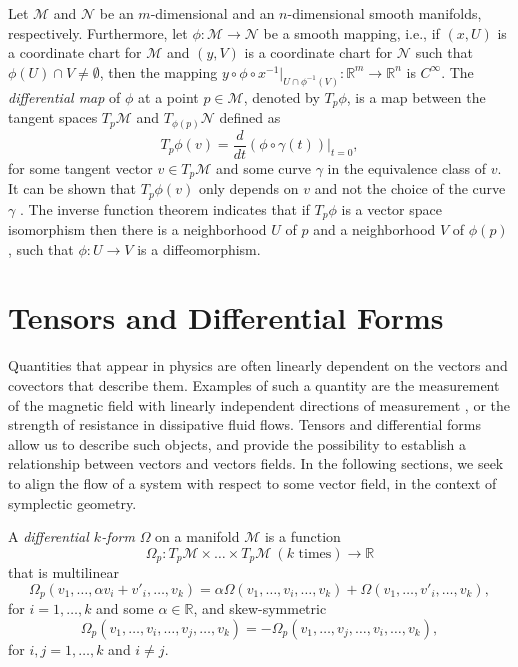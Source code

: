Let $\mathcal M$ and $\mathcal N$ be an $m$-dimensional and an $n$-dimensional smooth manifolds, respectively. Furthermore, let $\phi:\mathcal M\to \mathcal N$ be a smooth mapping, i.e., if $(x,U)$ is a coordinate chart for $\mathcal M$ and $(y,V)$ is a coordinate chart for $\mathcal N$ such that $\phi(U)\cap V\neq \emptyset$, then the mapping $y\circ \phi \circ x^{-1}|_{U\cap \phi^{-1}(V)}:\mathbb R^{m}\to \mathbb R^{n}$ is $C^{\infty}$. The \emph{differential map} of $\phi$ at a point $p\in \mathcal M$, denoted by $T_{p}\phi$, is a map between the tangent spaces $T_p \mathcal M$ and $T_{\phi(p)} \mathcal N$ defined as
\begin{equation} \label{eq:2.4}
	T_p \phi(v) = \frac{d}{dt}(\phi\circ \gamma(t))|_{t=0},
\end{equation}
for some tangent vector $v\in T_{p} \mathcal M$ and some curve $\gamma$ in the equivalence class of $v$. It can be shown that $T_p \phi(v)$ only depends on $v$ and not the choice of the curve $\gamma$ \cite{robbin2011introduction}. The inverse function theorem \cite{rudin1976principles} indicates that if $T_p\phi$ is a vector space isomorphism then there is a neighborhood $U$ of $p$ and a neighborhood $V$ of $\phi(p)$, such that $\phi:U\to V$ is a diffeomorphism.

\section{Tensors and Differential Forms} \label{section:2.2}
Quantities that appear in physics are often linearly dependent on the vectors and covectors that describe them. Examples of such a quantity are the measurement of the magnetic field with linearly independent directions of measurement \cite{Wald:106274}, or the strength of resistance in dissipative fluid flows. Tensors and differential forms allow us to describe such objects, and provide the possibility to establish a relationship between vectors and vectors fields. In the following sections, we seek to align the flow of a system with respect to some vector field, in the context of symplectic geometry. 

\begin{definition}
A \emph{differential $k$-form} $\Omega$ on a manifold $\mathcal M$ is a function 
\[
		\Omega_p: T_p\mathcal M \times \dots \times T_p\mathcal M \ (k \text{ times}) \to \mathbb R
\]
that is multilinear
\[
	\Omega_p(v_1,\dots,\alpha v_i + v'_i, \dots, v_k) = \alpha \Omega(v_1,\dots,v_i, \dots, v_k) + \Omega(v_1,\dots,v'_i, \dots, v_k),
\]
for $i=1,\dots,k$ and some $\alpha \in \mathbb R$, and skew-symmetric
\[
	\Omega_p(v_1,\dots,v_i,\dots,v_j, \dots, v_k) = - \Omega_p(v_1,\dots,v_j,\dots,v_i, \dots, v_k),
\]
for $i,j=1,\dots,k$ and $i\neq j$.
\end{definition}
 

